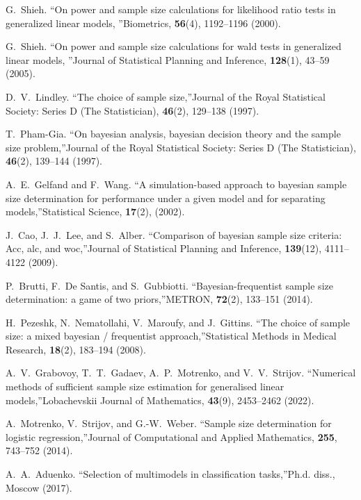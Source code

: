 \documentclass[
11pt,%
tightenlines,%
twoside,%
onecolumn,%
nofloats,%
nobibnotes,%
nofootinbib,%
superscriptaddress,%
noshowpacs,%
centertags]%
{revtex4-2}
\begin{document}
\begin{thebibliography}{99}
G.~Shieh. \textquotedblleft On power and sample size calculations for likelihood ratio tests in generalized linear models, \textquotedblright Biometrics, \textbf{56}(4), 1192--1196 (2000).

G.~Shieh. \textquotedblleft On power and sample size calculations for wald tests in generalized linear models, \textquotedblright Journal of Statistical Planning and Inference, \textbf{128}(1), 43--59 (2005).

D.~V.~Lindley. \textquotedblleft The choice of sample size,\textquotedblright Journal of the Royal Statistical Society: Series D (The Statistician), \textbf{46}(2), 129--138 (1997).

T.~Pham-Gia. \textquotedblleft On bayesian analysis, bayesian decision theory and the sample size problem,\textquotedblright Journal of the Royal Statistical Society: Series D (The Statistician), \textbf{46}(2), 139--144 (1997).

A.~E.~Gelfand and F.~Wang. \textquotedblleft A simulation-based approach to bayesian sample size determination for performance under a given model and for separating models,\textquotedblright Statistical Science, \textbf{17}(2), (2002).

J.~Cao, J.~J.~Lee, and S.~Alber. \textquotedblleft Comparison of bayesian sample size criteria: Acc, alc, and woc,\textquotedblright Journal of Statistical Planning and Inference, \textbf{139}(12), 4111--4122 (2009).

P.~Brutti, F.~De Santis, and S.~Gubbiotti. \textquotedblleft Bayesian-frequentist sample size determination: a game of two priors,\textquotedblright METRON, \textbf{72}(2), 133--151 (2014).

H.~Pezeshk, N.~Nematollahi, V.~Maroufy, and J.~Gittins. \textquotedblleft The choice of sample size: a mixed bayesian / frequentist approach,\textquotedblright Statistical Methods in Medical Research, \textbf{18}(2), 183--194 (2008).

A.~V.~Grabovoy, T.~T.~Gadaev, A.~P.~Motrenko, and V.~V.~Strijov. \textquotedblleft Numerical methods of sufficient sample size estimation for generalised linear models,\textquotedblright Lobachevskii Journal of Mathematics, \textbf{43}(9), 2453--2462 (2022).

A.~Motrenko, V.~Strijov, and G.-W.~Weber. \textquotedblleft Sample size determination for logistic regression,\textquotedblright Journal of Computational and Applied Mathematics, \textbf{255}, 743--752 (2014).

A.~A.~Aduenko. \textquotedblleft Selection of multimodels in classification tasks,\textquotedblright Ph.d. diss., Moscow (2017).

\end{thebibliography}
\end{document}
